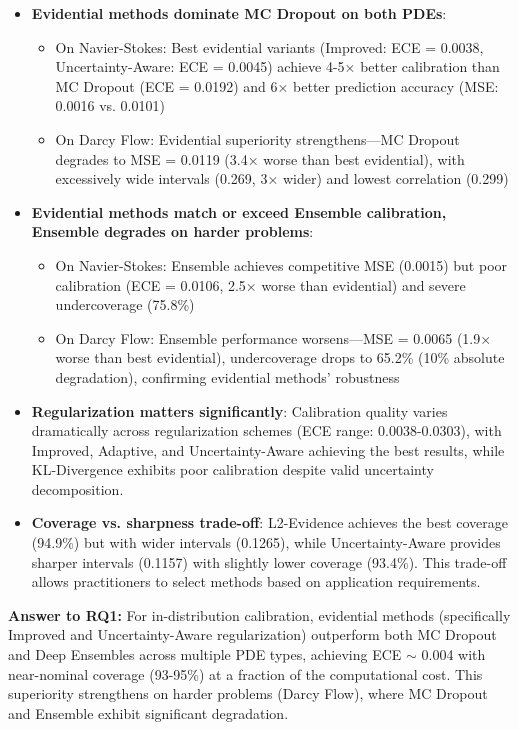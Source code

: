 \begin{itemize}
\item \textbf{Evidential methods dominate MC Dropout on both PDEs}:
\begin{itemize}
\item On Navier-Stokes: Best evidential variants (Improved: ECE = 0.0038, Uncertainty-Aware: ECE = 0.0045) achieve 4-5× better calibration than MC Dropout (ECE = 0.0192) and 6× better prediction accuracy (MSE: 0.0016 vs. 0.0101)
\item On Darcy Flow: Evidential superiority strengthens—MC Dropout degrades to MSE = 0.0119 (3.4× worse than best evidential), with excessively wide intervals (0.269, 3× wider) and lowest correlation (0.299)
\end{itemize}

\item \textbf{Evidential methods match or exceed Ensemble calibration, Ensemble degrades on harder problems}:
\begin{itemize}
\item On Navier-Stokes: Ensemble achieves competitive MSE (0.0015) but poor calibration (ECE = 0.0106, 2.5× worse than evidential) and severe undercoverage (75.8\%)
\item On Darcy Flow: Ensemble performance worsens—MSE = 0.0065 (1.9× worse than best evidential), undercoverage drops to 65.2\% (10\% absolute degradation), confirming evidential methods' robustness
\end{itemize}

\item \textbf{Regularization matters significantly}: Calibration quality varies dramatically across regularization schemes (ECE range: 0.0038-0.0303), with Improved, Adaptive, and Uncertainty-Aware achieving the best results, while KL-Divergence exhibits poor calibration despite valid uncertainty decomposition.

\item \textbf{Coverage vs. sharpness trade-off}: L2-Evidence achieves the best coverage (94.9\%) but with wider intervals (0.1265), while Uncertainty-Aware provides sharper intervals (0.1157) with slightly lower coverage (93.4\%). This trade-off allows practitioners to select methods based on application requirements.
\end{itemize}

\textbf{Answer to RQ1:} For in-distribution calibration, evidential methods (specifically Improved and Uncertainty-Aware regularization) outperform both MC Dropout and Deep Ensembles across multiple PDE types, achieving ECE $\sim$ 0.004 with near-nominal coverage (93-95\%) at a fraction of the computational cost. This superiority strengthens on harder problems (Darcy Flow), where MC Dropout and Ensemble exhibit significant degradation.

